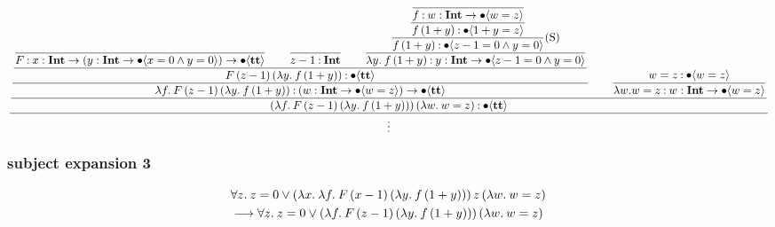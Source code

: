 \documentclass{article}
\begin{document}
\begin{equation*}
    \dfrac{
    \dfrac{
        \dfrac{
            \dfrac{
                \dfrac{
                }{
                F \mathbin{:} {x} : \textbf{Int} \to ({y} : \textbf{Int} \to \bullet \langle x = 0 \wedge y = 0 \rangle) \to \bullet \langle \textbf{tt} \rangle
                }
                \qquad
                \dfrac{}{
                z - 1 \mathbin{:} \textbf{Int}
                }
                \qquad
                \dfrac{
                    \dfrac{
                        \dfrac{
                            \dfrac{}{
                                f \mathbin{:} {w} : \textbf{Int} \to \bullet \langle w=z \rangle
                            }
                        }{
                            f\,(1+y) \mathbin{:} \bullet \langle 1+y=z \rangle
                        }
                    } {
                        f\,(1+y) \mathbin{:} \bullet \langle z - 1 = 0 \wedge y = 0 \rangle
                    }\text{(S)}
                } {
                    \lambda y.\: f\,(1+y) \mathbin{:} {y} : \textbf{Int} \to \bullet \langle z - 1 = 0 \wedge y = 0 \rangle
                }
            }{
                F\, (z-1)\, (\lambda y.\: f\,(1+y))  \mathbin{:} \bullet \langle \textbf{tt} \rangle
            }
        }{
            \lambda f.\: F\, (z-1)\, (\lambda y.\: f\,(1+y)) \mathbin{:} ({w} : \textbf{Int} \to \bullet \langle w = z \rangle) \to \bullet \langle \textbf{tt} \rangle
        }
        \qquad 
        \dfrac{
            w = z \mathbin{:} \bullet \langle  w = z \rangle
        }{
            \lambda w. w = z \mathbin{:} {w} : \textbf{Int} \to \bullet \langle w = z \rangle
        }
    }{
        (\lambda f.\: F\, (z-1)\, (\lambda y.\: f\,(1+y)))\, (\lambda w.\: w = z) \mathbin{:} \bullet \langle \textbf{tt} \rangle
    }}{
    \vdots
    }
\end{equation*}

\subsubsection{subject expansion 3}
\begin{align*}
    &\forall z.\: z=0 \vee (\lambda x.\: \lambda f.\: F\, (x-1)\, (\lambda y.\: f\,(1+y)))\, z\, (\lambda w.\: w = z) \\
    &\longrightarrow \forall z.\: z=0\vee (\lambda f.\: F\, (z-1)\, (\lambda y.\: f\,(1+y)))\, (\lambda w.\: w = z) 
\end{align*}
\end{document}
